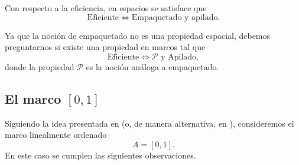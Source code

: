 \documentclass[11pt]{amsart}
\theoremstyle{plain}
\theoremstyle{definition}
\begin{document}
Con respecto a la eficiencia, en espacios se satisface que 
\[
\text{Eficiente}\iff \text{Empaquetado y apilado}.
\]

Ya que la noción de empaquetado no es una propiedad espacial, debemos preguntarnos si existe una propiedad en marcos tal que
\[
\text{Eficiente}\iff \mathcal{P}\text{ y Apilado},
\]
donde la propiedad $\mathcal{P}$ es la noción análoga a empaquetado.

\subsection{El marco $[0,1]$}
Siguiendo la idea presentada en \cite{simmons2006regularity} (o, de manera alternativa, en \cite{simmons2004vietoris}), consideremos el marco linealmente ordenado 
\[
A=[0,1].
\] 
En este caso se cumplen las siguientes observaciones.
\end{document}
